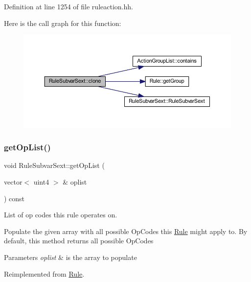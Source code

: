 Definition at line 1254 of file ruleaction.\+hh.

Here is the call graph for this function\+:
\nopagebreak
\begin{figure}[H]
\begin{center}
\leavevmode
\includegraphics[width=350pt]{class_rule_subvar_sext_a8221b3db32eeca254df5da4825b7a527_cgraph}
\end{center}
\end{figure}
\mbox{\label{class_rule_subvar_sext_aeda0eb1eb56bc2c5d8b54c2b01a8876b}} 
\subsubsection{\texorpdfstring{getOpList()}{getOpList()}}
{\footnotesize\ttfamily void Rule\+Subvar\+Sext\+::get\+Op\+List (\begin{DoxyParamCaption}\item[{vector$<$ uint4 $>$ \&}]{oplist }\end{DoxyParamCaption}) const\hspace{0.3cm}{\ttfamily [virtual]}}



List of op codes this rule operates on. 

Populate the given array with all possible Op\+Codes this \mbox{\hyperlink{class_rule}{Rule}} might apply to. By default, this method returns all possible Op\+Codes 
\begin{DoxyParams}{Parameters}
{\em oplist} & is the array to populate \\
\hline
\end{DoxyParams}


Reimplemented from \mbox{\hyperlink{class_rule_a4023bfc7825de0ab866790551856d10e}{Rule}}.




